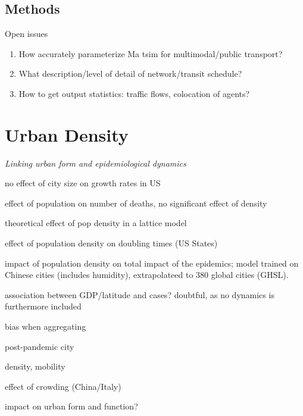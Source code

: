 \documentclass[10pt]{article}
\begin{document}
\subsection{Methods}

Open issues
\begin{enumerate}
	\item How accurately parameterize Ma	tsim for multimodal/public transport?
	\item What description/level of detail of network/transit schedule?
	\item How to get output statistics: traffic flows, colocation of agents?
\end{enumerate}


	
\section{Urban Density}

\textit{Linking urban form and epidemiological dynamics}


\cite{2020arXiv200401248H} no effect of city size on growth rates in US
	
\cite{angel2020coronavirus} effect of population on number of deaths, no significant effect of density

\cite{tarwater2001effects} theoretical effect of pop density in a lattice model	

\cite{White2020.04.14.20065318} effect of population density on doubling times (US States)
	
\cite{Rader2020.04.15.20064980} impact of population density on total impact of the epidemics; model trained on Chinese cities (includes humidity), extrapolateed to 380 global cities (GHSL).

\cite{2020arXiv200400110M} association between GDP/latitude and cases? doubtful, as no dynamics is furthermore included

\cite{2020arXiv200412994B} bias when aggregating

\cite{doi:10.1177/2399808320926912} post-pandemic city

\cite{bouffanais2020cities} density, mobility

	
\cite{rader2020crowding} effect of crowding (China/Italy)
	
\cite{batty2020social} impact on urban form and function?

\cite{huanglarge}

\cite{ivey2020land}
\end{document}
